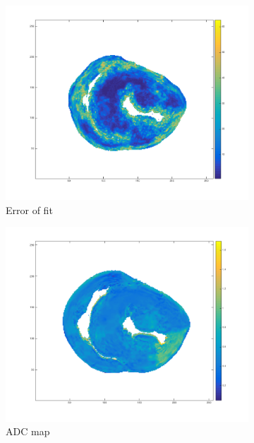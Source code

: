 \begin{figure}
    \centering
    \begin{subfigure}{.31\textwidth}
        \includegraphics[width=\textwidth]{figures/pig5_err_22}
        \caption{Error of fit}
        \label{fig:pig5_err}
    \end{subfigure}
    \begin{subfigure}{.31\textwidth}
        \includegraphics[width=\textwidth]{figures/pig5_adc_22}
        \caption{ADC map}
        \label{fig:pig5_adc}
    \end{subfigure}
    \begin{subfigure}{.31\textwidth}

\end{subfigure}
\end{figure}
